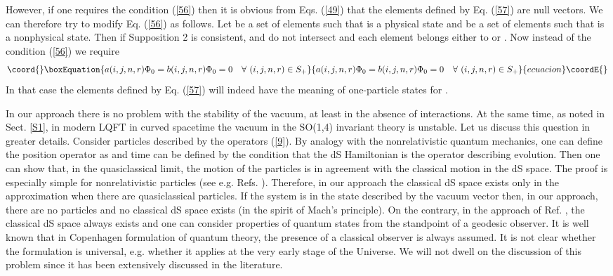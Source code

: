 \documentclass[a4paper,12pt]{article}%
\begin{document}
However, if one requires the condition (\ref{56})
then it is obvious from Eqs. (\ref{49})
that the elements defined by 
Eq. (\ref{57}) are null vectors. 
We can therefore try to modify
Eq. (\ref{56}) as follows. Let \coordHE{} be a set 
of elements \coordHE{} such that \coordHE{} is
a physical state and \coordHE{} be a set 
of elements \coordHE{} such that \coordHE{} is
a nonphysical state. Then if Supposition 2 is
consistent, \coordHE{} and \coordHE{} do not intersect
and each element \coordHE{} belongs either to
\coordHE{} or \coordHE{}. Now instead of the condition 
(\ref{56}) we require 
\begin{equation}\coord{}\boxEquation{
a(i,j,n,r)\Phi_0=b(i,j,n,r)\Phi_0=0\quad 
\forall\,\, (i,j,n,r)\in S_+ 
\label{58}
}{
a(i,j,n,r)\Phi_0=b(i,j,n,r)\Phi_0=0\quad 
\forall\,\, (i,j,n,r)\in S_+ 
}{ecuacion}\coordE{}\end{equation}
In that case the elements defined by Eq. (\ref{57}) 
will indeed have the meaning of one-particle states
for \coordHE{}. 

In our approach there is no problem with the stability
of the vacuum, at least in the absence of interactions.
At the same time, as noted in Sect. \ref{S1}, in modern
LQFT in curved spacetime \cite{Narlikar} the vacuum in 
the SO(1,4) invariant theory is unstable. Let us 
discuss this question in greater details. 
Consider particles described by the operators (\ref{9}).
By analogy with the nonrelativistic quantum mechanics, 
one can define the position operator as 
\coordHE{}
and time can be defined by the condition that the dS
Hamiltonian is the operator describing evolution. 
Then one can show that, in the quasiclassical limit, the 
motion of the particles is in agreement with the 
classical motion in the dS space. The proof is 
especially simple for nonrelativistic particles 
(see e.g. Refs. 
\cite{lev1,lev1a,lev3}). Therefore, in our approach 
the classical dS space exists only in the approximation
when there are quasiclassical particles. If the system
is in the state described by the vacuum vector \coordHE{}
then, in our approach, there are no particles and no 
classical dS space exists (in the spirit of Mach's principle). 
On the contrary, in the approach of Ref. \cite{Narlikar},
the classical dS space always exists and one can consider
properties of quantum states from the standpoint of a
geodesic observer. It is well known that in Copenhagen 
formulation of quantum theory, the presence of
a classical observer is always assumed. It is not clear 
whether the formulation is universal, e.g. whether it applies
at the very early stage of the Universe. We will not dwell
on the discussion of this problem since it has 
been extensively discussed in the literature.
 
\end{document}

